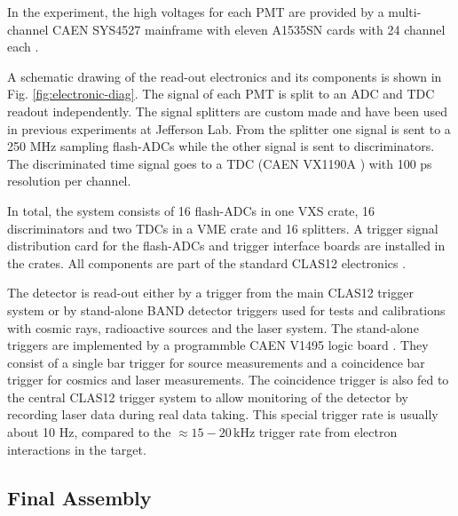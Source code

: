 \documentclass[3p,final,twocolumn]{elsarticle}
\begin{document}
In the experiment, the high voltages for each PMT are provided by a multi-channel CAEN SYS4527 mainframe with eleven A1535SN cards with 24 channel each \cite{caen-hvframe,caen-hvcard}.

A schematic drawing of the read-out electronics and its components is
shown in Fig. \ref{fig:electronic-diag}. The signal of each PMT is
split to an ADC and TDC readout independently.  The signal splitters
are custom made and have been used in previous experiments at
Jefferson Lab.  From the splitter one signal is sent to a 250
\si{\mega\hertz} sampling flash-ADCs \cite{fadc-manual} while the
other signal is sent to discriminators.  The discriminated time signal
goes to a TDC (CAEN VX1190A \cite{caen-tdc}) with 100 ps resolution
per channel.


In total, the system consists of 16 flash-ADCs in one VXS crate, 16
discriminators and two TDCs in a VME crate and 16 splitters.
A trigger signal distribution card for the flash-ADCs and
trigger interface boards are installed in the crates. All components
are part of the standard CLAS12 electronics \cite{clas12-daq, clas12-trigger}.

The detector is read-out either by a trigger from the main CLAS12
trigger system \cite{clas12-trigger} or by stand-alone BAND detector
triggers used for tests and calibrations with cosmic rays, radioactive
sources and the laser system. The stand-alone triggers are implemented
by a programmble CAEN V1495 logic board \cite{caen-logicboard}. They
consist of a single bar trigger for source measurements and a
coincidence bar trigger for cosmics and laser measurements. The
coincidence trigger is also fed to the central CLAS12 trigger system
to allow monitoring of the detector by recording laser data during
real data taking. This special trigger rate is usually about 10
\si{\hertz}, compared to the $\approx 15-20\,\si{\kilo\hertz}$ trigger
rate from electron interactions in the target.




\subsection{Final Assembly}
\label{sec:assembly}
\end{document}

